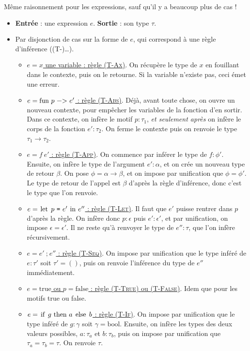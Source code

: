 \documentclass[11pt]{article}
\begin{document}
Même raisonnement pour les expressions, sauf qu'il y a beaucoup plus de cas !

\begin{itemize}
    \item \textbf{Entrée} : une expression $e$. \textbf{Sortie} : son type $\tau$.
    \item Par disjonction de cas sur la forme de $e$, qui correspond à une règle d'inférence ({\scshape(T-)\dots}).
    \begin{itemize}
        \item \underline{$e=x$ une variable : règle ({\scshape{T-Ax}})}. On récupère le type de $x$ en fouillant dans le contexte, puis on le retourne. Si la variable n'existe pas, ceci émet une erreur.
        \item \underline{$e=\text{\lstinline|fun|}~p~\text{\lstinline|->|}~e'$ : règle ({\scshape{T-Abs}})}. Déjà, avant toute chose, on ouvre un nouveau contexte, pour empêcher les variables de la fonction d'en sortir. Dans ce contexte, on infère le motif $p:\tau_1$, \textit{et seulement après} on infère le corps de la fonction $e':\tau_2$. On ferme le contexte puis on renvoie le type $\tau_1\to\tau_2$.
        \item \underline{$e=f~e'$ : règle ({\scshape{T-App}})}. On commence par inférer le type de $f:\phi'$. Ensuite, on infère le type de l'argument $e':\alpha$, et on crée un nouveau type de retour $\beta$. On pose $\phi=\alpha\to\beta$, et on impose par unification que $\phi=\phi'$. Le type de retour de l'appel est $\beta$ d'après la règle d'inférence, donc c'est le type que l'on renvoie.
        \item \underline{$e=\text{\lstinline|let|}~p~\texttt{=}~e'~\text{\lstinline|in|}~e''$ : règle ({\scshape{T-Let}})}. Il faut que $e'$ puisse rentrer dans $p$ d'après la règle. On infère donc $p:\epsilon$ puis $e':\epsilon'$, et par unification, on impose $\epsilon=\epsilon'$. Il ne reste qu'à renvoyer le type de $e'':\tau$, que l'on infère récursivement.
        \item \underline{$e=e'~\texttt{;}~e''$ : règle ({\scshape{T-Seq}})}. On impose par unification que le type inféré de $e:\tau'$ soit $\tau'=()$, puis on renvoie l'inférence du type de $e''$ immédiatement.
        \item \underline{$e=\text{true}$ ou $p=\text{false}$ : règle ({\scshape{T-True}}) ou ({\scshape{T-False}})}. Idem que pour les motifs true ou false.
        \item \underline{$e=\text{\lstinline|if|}~g~\text{\lstinline|then|}~a~\text{\lstinline|else|}~b$ : règle ({\scshape{T-If}})}. On impose par unification que le type inféré de $g:\gamma$ soit $\gamma=\text{bool}$. Ensuite, on infère les types des deux valeurs possibles, $a:\tau_a$ et $b:\tau_b$, puis on impose par unification que $\tau_a=\tau_b=\tau$. On renvoie $\tau$.

\end{itemize}
\end{itemize}
\end{document}
